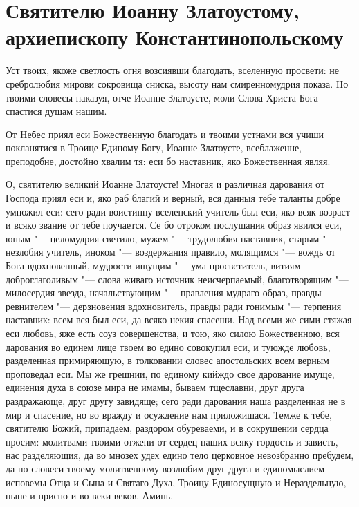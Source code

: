 \section{Святителю Иоанну Златоустому, архиепископу Константинопольскому}\begin{mymulticols}


Уст твоих, якоже светлость огня возсиявши благодать, вселенную просвети: не сребролюбия мирови сокровища сниска, высоту нам смиренномудрия показа. Hо твоими словесы наказуя, отче Иоанне Златоусте, моли Слова Христа Бога спастися душам нашим.


От Hебес приял еси Божественную благодать и твоими устнами вся учиши покланятися в Троице Единому Богу, Иоанне Златоусте, всеблаженне, преподобне, достойно хвалим тя: еси бо наставник, яко Божественная являя.


О, святителю великий Иоанне Златоусте! Многая и различная дарования от Господа приял еси и, яко раб благий и верный, вся данныя тебе таланты добре умножил еси: сего ради воистинну вселенский учитель был еси, яко всяк возраст и всяко звание от тебе поучается. Се бо отроком послушания образ явился еси, юным "--- целомудрия светило, мужем "--- трудолюбия наставник, старым "--- незлобия учитель, иноком "--- воздержания правило, молящимся "--- вождь от Бога вдохновенный, мудрости ищущим "--- ума просветитель, витиям доброглаголивым "--- слова живаго источник неисчерпаемый, благотворящим "--- милосердия звезда, начальствующим "--- правления мудраго образ, правды ревнителем "--- дерзновения вдохновитель, правды ради гонимым "--- терпения наставник: всем вся был еси, да всяко некия спасеши. Над всеми же сими стяжая еси любовь, яже есть соуз совершенства, и тою, яко силою Божественною, вся дарования во единем лице твоем во едино совокупил еси, и туюжде любовь, разделенная примиряющую, в толковании словес апостольских всем верным проповедал еси. Мы же грешнии, по единому кийждо свое дарование имуще, единения духа в союзе мира не имамы, бываем тщеславни, друг друга раздражающе, друг другу завидяще; сего ради дарования наша разделенная не в мир и спасение, но во вражду и осуждение нам приложишася. Темже к тебе, святителю Божий, припадаем, раздором обуреваеми, и в сокрушении сердца просим: молитвами твоими отжени от сердец наших всяку гордость и зависть, нас разделяющия, да во мнозех удех едино тело церковное невозбранно пребудем, да по словеси твоему молитвенному возлюбим друг друга и единомыслием исповемы Отца и Сына и Святаго Духа, Троицу Единосущную и Нераздельную, ныне и присно и во веки веков. Аминь.

\mychapterending[1.5][0.3]

\end{mymulticols}

